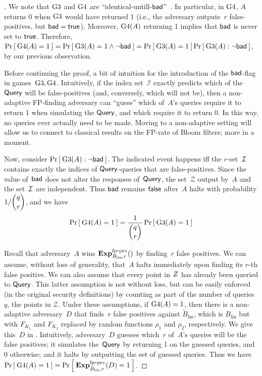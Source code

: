 \begin{proof}[]
We note that $\text{G3}$ and $\text{G4}$ are
``identical-untill-$\mathsf{bad}$''~\cite{BeRo-gameplaying}.  In particular,
in $\text{G4}$, $A$ returns 0 when $\text{G3}$ would have returned 1 (i.e.,
the adversary outputs~$r$ false-positives, but $\mathsf{bad}=\mathsf{true}$).  
Moreover,  $\text{G4}(A)$ returning 1 implies that $\mathsf{bad}$ is never set to $\mathsf{true}$. Therefore,
$\Pr\left[\: \text{G4}(A)=1 \:\right] = \Pr\left[\: \text{G3}(A)=1 \wedge \neg\mathsf{bad} \:\right] =
\Pr\left[\: \text{G3}(A)=1 \:\right] \Pr\left[\: \text{G3}(A) : \neg\mathsf{bad} \:\right]$, by our previous observation.

Before continuing the proof, a bit of intuition for the introduction
of the $\mathsf{bad}$-flag in games~$\text{G3},\text{G4}$.   Intuitively, if the index
set~$\mathcal{I}$ exactly predicts which of the $\mathsf{Query}$ will be
false-positives (and, conversely, which will not be), then a
non-adaptive FP-finding adversary can ``guess'' which of~$A$'s queries require it
to return 1 when simulating the $\mathsf{Query}$, and which require it to
return 0.  In this way, no queries ever actually need to be made.
Moving to a non-adaptive setting will allow us to connect to classical
results on the FP-rate of Bloom filters; more in a moment. 

Now, consider $\Pr\left[\: \text{G3}(A) : \neg\mathsf{bad} \:\right]$.  The indicated event
happens iff the $r$-set~${\cal I}$ contains exactly the indices of
$\mathsf{Query}$-queries that are false-positives.  Since the value
of~$\mathsf{bad}$ does not alter the responses of~$\mathsf{Query}$, the
set~$\mathcal{Z}$ output by~$A$ and the set~${\cal I}$ are independent.
Thus $\mathsf{bad}$ remains $\mathsf{false}$ after~$A$ halts with probability
$1/\dbinom{q}{r}$, and we have 
\begin{equation*}
\Pr\left[\: \text{G4}(A)=1 \:\right] = \frac{1}{\dbinom{q}{r}}\Pr\left[\: \text{G3}(A)=1 \:\right]
\end{equation*}

Recall that adversary~$A$ wins $\mathrm{\mathbf{Exp}}^{\mathrm{fp\mbox{-}prv}}_{B_{\mathrm{lin}},r}()$ by finding~$r$ false positives. We can assume, without loss of generality,  that~$A$ halts immediately upon finding its $r$-th false positive.  We can also assume that every point in ${\cal Z}$ has already been queried to $\mathsf{Query}$.  This latter assumption is not without loss, but can be  easily enforced (in the original security definitions) by counting as part of the number of queries~$q$, the points in $\mathcal{Z}$. 
%
Under these assumptions, if $\text{G4}(A)=1$, then there is a non-adaptive adversary~$D$ that finds~$r$ false positives against $\tilde{B}_{\mathrm{lin}}$, which is $B_{\mathrm{lin}}$ but with $F_{K_1}$ and $F_{K_2}$ replaced by random functions $\rho_1$ and $\rho_2$, respectively.  We give this~$D$ in . Intuitively, adversary~$D$ guesses which~$r$ of~$A$'s queries will be the false positives; it simulates the~$\mathsf{Query}$ by returning 1 on the guessed queries, and 0 otherwise; and it halts by outputting the set of guessed queries.  Thus we have
$\Pr\left[\: \text{G4}(A)=1 \:\right] =\Pr\left[\: \mathrm{\mathbf{Exp}}^{\mathrm{fp\mbox{-}prv}}_{\tilde{B}_{\mathrm{lin}},r}(D) = 1 \:\right]$.


\end{proof}

